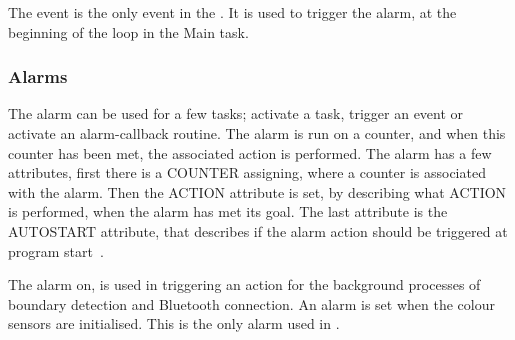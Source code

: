 The event is the only event in the \projname{}. It is used to trigger the alarm, at the beginning of the loop in the Main task. 

\subsubsection{Alarms} \label{sec:alarms}
The alarm can be used for a few tasks; activate a task, trigger an event or activate an alarm-callback routine. The alarm is run on a counter, and when this counter has been met, the associated action is performed. The alarm has a few attributes, first there is a COUNTER assigning, where a counter is associated with the alarm. Then the ACTION attribute is set, by describing what ACTION is performed, when the alarm has met its goal. The last attribute is the AUTOSTART attribute, that describes if the alarm action should be triggered at program start~\citep{osekoil}.

The alarm on, is used in triggering an action for the background processes of boundary detection and Bluetooth connection. An alarm is set when the colour sensors are initialised. This is the only alarm used in \projname{}.
